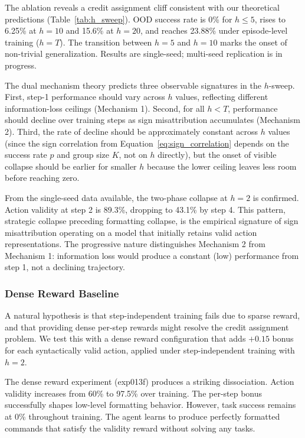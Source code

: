 
The ablation reveals a credit assignment cliff consistent with our theoretical predictions (Table~\ref{tab:h_sweep}). OOD success rate is 0\% for $h \leq 5$, rises to 6.25\% at $h = 10$ and 15.6\% at $h = 20$, and reaches 23.88\% under episode-level training ($h = T$). The transition between $h = 5$ and $h = 10$ marks the onset of non-trivial generalization. Results are single-seed; multi-seed replication is in progress.

The dual mechanism theory predicts three observable signatures in the $h$-sweep. First, step-1 performance should vary across $h$ values, reflecting different information-loss ceilings (Mechanism 1). Second, for all $h < T$, performance should decline over training steps as sign misattribution accumulates (Mechanism 2). Third, the rate of decline should be approximately constant across $h$ values (since the sign correlation from Equation~\ref{eq:sign_correlation} depends on the success rate $p$ and group size $K$, not on $h$ directly), but the onset of visible collapse should be earlier for smaller $h$ because the lower ceiling leaves less room before reaching zero.

From the single-seed data available, the two-phase collapse at $h = 2$ is confirmed. Action validity at step 2 is 89.3\%, dropping to 43.1\% by step 4. This pattern, strategic collapse preceding formatting collapse, is the empirical signature of sign misattribution operating on a model that initially retains valid action representations. The progressive nature distinguishes Mechanism 2 from Mechanism 1: information loss would produce a constant (low) performance from step 1, not a declining trajectory.

\subsubsection{Dense Reward Baseline}
\label{sec:results_dense}

A natural hypothesis is that step-independent training fails due to sparse reward, and that providing dense per-step rewards might resolve the credit assignment problem. We test this with a dense reward configuration that adds $+0.15$ bonus for each syntactically valid action, applied under step-independent training with $h = 2$.

The dense reward experiment (exp013f) produces a striking dissociation. Action validity increases from 60\% to 97.5\% over training. The per-step bonus successfully shapes low-level formatting behavior. However, task success remains at 0\% throughout training. The agent learns to produce perfectly formatted commands that satisfy the validity reward without solving any tasks.

